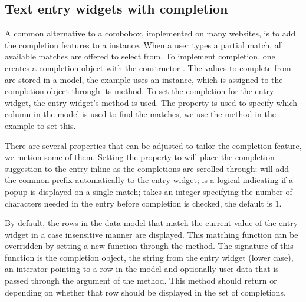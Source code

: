 \subsection{Text entry widgets with completion}
\label{sec:RGtk2:entry-completion}

A common alternative to a combobox, implemented on many websites, is to add the completion features to a
 instance. When a user types a partial match,
all available matches are offered to select from. To implement completion, one creates
a completion object with the constructor
. The values to complete from are
stored in a model, the example uses an  instance,
which is assigned to the completion object through its
 method. To set the completion
for the entry widget, the entry widget's
 method is used. The
 property is used to specify which column in
the model is used to find the matches, we use the method
 in the example to set this.


There are several properties that can be adjusted to tailor the
completion feature, we metion some of them. Setting the property
 to  will place the completion
suggestion to the entry inline as the completions are scrolled
through;  will add the common prefix
automatically to the entry widget;  is a
logical indicating if a popup is displayed on a single match;
 takes an integer specifying the number of
characters needed in the entry before completion is checked, the
default is $1$.

By default, the rows in the data model that match the
current value of the entry widget in a case insensitive manner are displayed. This
matching function can be overridden by setting a new function through
the  method. The signature of
this function is the completion object, the string from the entry
widget (lower case), an interator pointing to a row in the model and optionally
user data that is passed through the  argument of the
 method. This method should return  or
 depending on whether that row should be displayed in the
set of completions.


